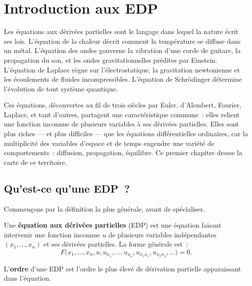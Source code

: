 \chapter{Introduction aux EDP}
\label{ch:introduction}

Les \'equations aux d\'eriv\'ees partielles sont le langage dans lequel la
nature \'ecrit ses lois. L'\'equation de la chaleur d\'ecrit comment la
temp\'erature se diffuse dans un m\'etal. L'\'equation des ondes gouverne la
vibration d'une corde de guitare, la propagation du son, et les ondes
gravitationnelles pr\'edites par Einstein. L'\'equation de Laplace r\`egne sur
l'\'electrostatique, la gravitation newtonienne et les \'ecoulements de
fluides incompressibles. L'\'equation de Schr\"odinger d\'etermine l'\'evolution
de tout syst\`eme quantique.

Ces \'equations, d\'ecouvertes au fil de trois si\`ecles par Euler,
d'Alembert, Fourier, Laplace, et tant d'autres, partagent une
caract\'eristique commune~: elles relient une fonction inconnue de
plusieurs variables \`a ses d\'eriv\'ees partielles. Elles sont plus riches
--- et plus difficiles --- que les \'equations diff\'erentielles ordinaires,
car la multiplicit\'e des variables d'espace et de temps engendre une
vari\'et\'e de comportements~: diffusion, propagation, \'equilibre. Ce premier
chapitre dresse la carte de ce territoire.

\section{Qu'est-ce qu'une EDP~?}

Commen\c{c}ons par la d\'efinition la plus g\'en\'erale, avant de sp\'ecialiser.

\begin{definition}
Une \textbf{\'equation aux d\'eriv\'ees partielles} (EDP) est une \'equation
faisant intervenir une fonction inconnue $u$ de plusieurs variables
ind\'ependantes $(x_1, \ldots, x_n)$ et ses d\'eriv\'ees partielles.
La forme g\'en\'erale est~:
\[
    F\bigl(x_1, \ldots, x_n, u, u_{x_1}, \ldots, u_{x_n},
    u_{x_1 x_1}, u_{x_1 x_2}, \ldots\bigr) = 0.
\]
\end{definition}

\begin{definition}
L'\textbf{ordre} d'une EDP est l'ordre le plus \'elev\'e de d\'erivation
partielle apparaissant dans l'\'equation.
\end{definition}

